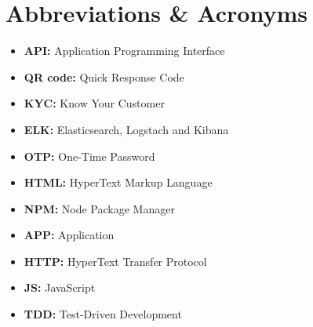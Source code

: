 \chapter*{Abbreviations \& Acronyms}

\begin{itemize}
	\item \textbf{API:}  Application Programming Interface
	\item \textbf{QR code:} Quick Response Code
	 \item \textbf{KYC:} Know Your Customer
	\item \textbf{ELK:}  Elasticsearch, Logstach and Kibana
	\item \textbf{OTP:} One-Time Password
	\item \textbf{HTML:}  HyperText Markup Language
	\item \textbf{NPM:} Node Package Manager
	\item \textbf{APP:} Application
	\item \textbf{HTTP:} HyperText Transfer Protocol
	\item \textbf{JS:} JavaScript
	\item \textbf{TDD:} Test-Driven Development 
\end{itemize}